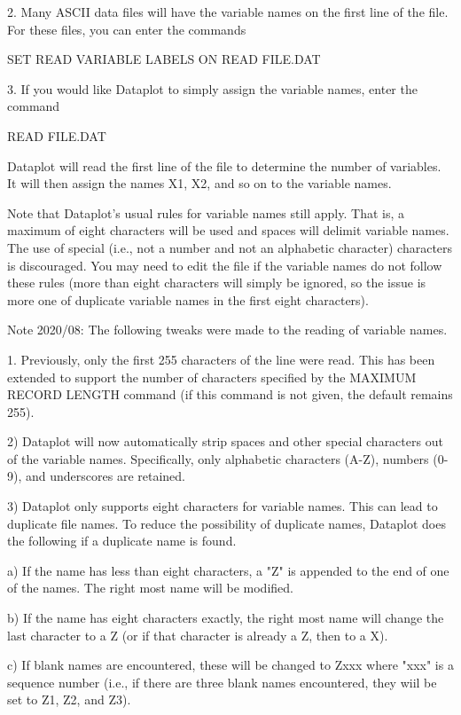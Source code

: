   2. Many ASCII data files will have the variable names on
     the first line of the file.  For these files, you can
     enter the commands

        SET READ VARIABLE LABELS ON
        READ FILE.DAT

  3. If you would like Dataplot to simply assign the variable
     names, enter the command

         READ FILE.DAT

     Dataplot will read the first line of the file to determine
     the number of variables.  It will then assign the names
     X1, X2, and so on to the variable names.

Note that Dataplot's usual rules for variable names still apply.
That is, a maximum of eight characters will be used and spaces will
delimit variable names.  The use of special (i.e., not a number and
not an alphabetic character) characters is discouraged.  You may
need to edit the file if the variable names do not follow these
rules (more than eight characters will simply be ignored, so the
issue is more one of duplicate variable names in the first eight
characters).

Note 2020/08: The following tweaks were made to the reading of
variable names.

  1. Previously, only the first 255 characters of the line were read.
     This has been extended to support the number of characters
     specified by the MAXIMUM RECORD LENGTH command (if this command is
     not given, the default remains 255).

  2) Dataplot will now automatically strip spaces and other special
     characters out of the variable names.  Specifically, only alphabetic
     characters (A-Z), numbers (0-9), and underscores are retained.

  3) Dataplot only supports eight characters for variable names.  This
     can lead to duplicate file names.  To reduce the possibility of
     duplicate names, Dataplot does the following if a duplicate name
     is found.

     a) If the name has less than eight characters, a "Z" is appended
        to the end of one of the names.  The right most name will
        be modified.

     b) If the name has eight characters exactly, the right most name
        will change the last character to a Z (or if that character is
        already a Z, then to a X).

     c) If blank names are encountered, these will be changed to
        Zxxx where "xxx" is a sequence number (i.e., if there are three
        blank names encountered, they wiil be set to Z1, Z2, and Z3).


